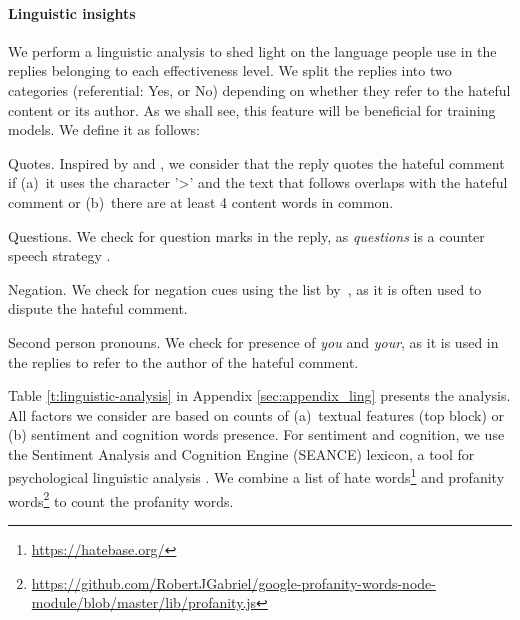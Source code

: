 \documentclass[11pt]{article}
\begin{document}
\paragraph{Linguistic insights} 
We perform a linguistic analysis to shed light on the language people use in the replies belonging to each effectiveness level.
We split the replies into two categories (referential: Yes, or No) depending on whether they refer to the hateful content or its author.
As we shall see, this feature will be beneficial for training models.
We define it as follows:
\begin{compactitem}
	\item Quotes. Inspired by \citet{chakrabarty-etal-2019-ampersand} and \citet{jo-etal-2020-detecting},
	we consider that the reply quotes the hateful comment if
	(a)~it uses the character '>' and the text that follows overlaps with the hateful comment
	or
	(b)~there are at least 4 content words in common.
	
	
	\item Questions. We check for question marks in the reply, as \emph{questions} is a counter speech strategy \cite{chung-etal-2021-multilingual}.
	
	\item Negation. We check for negation cues using the list by~\citet{fancellu-etal-2016-neural},
	as it is often used to dispute the hateful comment.
	
	\item Second person pronouns. We check for presence of \emph{you} and \emph{your}, as it is used in the replies to refer to the author of the hateful comment.
\end{compactitem}

Table \ref{t:linguistic-analysis} in Appendix \ref{sec:appendix_ling} presents the analysis.
All factors we consider are based on counts of
(a)~textual features (top block)
or
(b) sentiment and cognition words presence.
For sentiment and cognition, we use the Sentiment Analysis and Cognition Engine (SEANCE) lexicon,
a tool for psychological linguistic analysis \cite{crossley2017sentiment}. 
We combine a list of hate words\footnote{\url{https://hatebase.org/}} and profanity words\footnote{\url{https://github.com/RobertJGabriel/google-profanity-words-node-module/blob/master/lib/profanity.js}} to count the profanity words.
\end{document}

